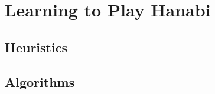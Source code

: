 \section{Learning to Play Hanabi}\label{sec:learninghanabi}


\subsection{Heuristics}


\subsection{Algorithms}

